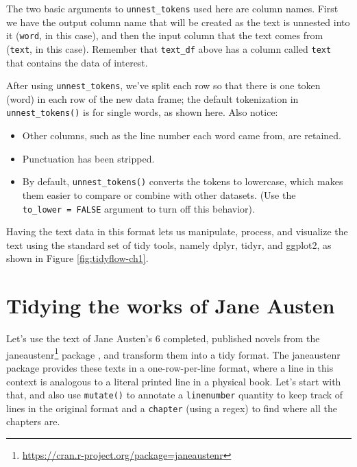 \documentclass[
]{book}
\DeclareRobustCommand{\href}[2]{#2\footnote{\url{#1}}}
\providecommand{\tightlist}{%
  \setlength{\itemsep}{0pt}\setlength{\parskip}{0pt}}
\begin{document}
The two basic arguments to \texttt{unnest\_tokens} used here are column names. First we have the output column name that will be created as the text is unnested into it (\texttt{word}, in this case), and then the input column that the text comes from (\texttt{text}, in this case). Remember that \texttt{text\_df} above has a column called \texttt{text} that contains the data of interest.

After using \texttt{unnest\_tokens}, we've split each row so that there is one token (word) in each row of the new data frame; the default tokenization in \texttt{unnest\_tokens()} is for single words, as shown here. Also notice:

\begin{itemize}
\tightlist
\item
  Other columns, such as the line number each word came from, are retained.
\item
  Punctuation has been stripped.
\item
  By default, \texttt{unnest\_tokens()} converts the tokens to lowercase, which makes them easier to compare or combine with other datasets. (Use the \texttt{to\_lower\ =\ FALSE} argument to turn off this behavior).
\end{itemize}

Having the text data in this format lets us manipulate, process, and visualize the text using the standard set of tidy tools, namely dplyr, tidyr, and ggplot2, as shown in Figure \ref{fig:tidyflow-ch1}.

\hypertarget{tidyausten}{%
\section{Tidying the works of Jane Austen}\label{tidyausten}}

Let's use the text of Jane Austen's 6 completed, published novels from the \href{https://cran.r-project.org/package=janeaustenr}{janeaustenr} package \citep{R-janeaustenr}, and transform them into a tidy format. The janeaustenr package provides these texts in a one-row-per-line format, where a line in this context is analogous to a literal printed line in a physical book. Let's start with that, and also use \texttt{mutate()} to annotate a \texttt{linenumber} quantity to keep track of lines in the original format and a \texttt{chapter} (using a regex) to find where all the chapters are.
\end{document}
